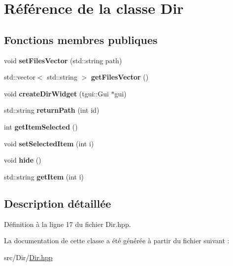 \hypertarget{classDir}{\section{Référence de la classe Dir}
\label{classDir}
}
\subsection*{Fonctions membres publiques}
\begin{DoxyCompactItemize}
\item 
\hypertarget{classDir_af635ae8d3f73e276fd4809443294c922}{void {\bfseries set\+Files\+Vector} (std\+::string path)}\label{classDir_af635ae8d3f73e276fd4809443294c922}

\item 
\hypertarget{classDir_a93214e588267bd1b9fea42ab5334477e}{std\+::vector$<$ std\+::string $>$ {\bfseries get\+Files\+Vector} ()}\label{classDir_a93214e588267bd1b9fea42ab5334477e}

\item 
\hypertarget{classDir_a8a201475486c0a0e7a8d8243e6b50df2}{void {\bfseries create\+Dir\+Widget} (tgui\+::\+Gui $\ast$gui)}\label{classDir_a8a201475486c0a0e7a8d8243e6b50df2}

\item 
\hypertarget{classDir_a86b006137e1060d5219ca36da54c57b6}{std\+::string {\bfseries return\+Path} (int id)}\label{classDir_a86b006137e1060d5219ca36da54c57b6}

\item 
\hypertarget{classDir_aab53eceedc1485700282493f41fa9227}{int {\bfseries get\+Item\+Selected} ()}\label{classDir_aab53eceedc1485700282493f41fa9227}

\item 
\hypertarget{classDir_abde90c9dd3b727623700c6564b6c501b}{void {\bfseries set\+Selected\+Item} (int i)}\label{classDir_abde90c9dd3b727623700c6564b6c501b}

\item 
\hypertarget{classDir_aedeb46b9ae54b81a712a53efa3144c8c}{void {\bfseries hide} ()}\label{classDir_aedeb46b9ae54b81a712a53efa3144c8c}

\item 
\hypertarget{classDir_a2fe90aa7cdf0e3fdc9cd46785d191e6f}{std\+::string {\bfseries get\+Item} (int i)}\label{classDir_a2fe90aa7cdf0e3fdc9cd46785d191e6f}

\end{DoxyCompactItemize}


\subsection{Description détaillée}


Définition à la ligne 17 du fichier Dir.\+hpp.



La documentation de cette classe a été générée à partir du fichier suivant \+:\begin{DoxyCompactItemize}
\item 
src/\+Dir/\hyperlink{Dir_8hpp}{Dir.\+hpp}\end{DoxyCompactItemize}
